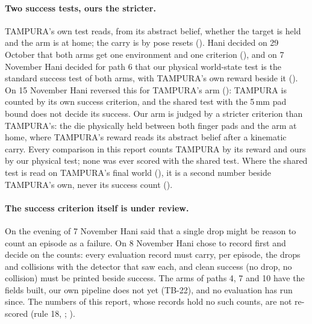 \paragraph{Two success tests, ours the stricter.} TAMPURA's own test reads, from its abstract belief,
whether the target is held and the arm is at home; the carry is by pose resets
(). Hani decided on 29
October that both arms get one environment and one criterion (), and on 7
November Hani decided for path 6 that our physical world-state test is the standard
success test of both arms, with TAMPURA's own reward beside it (). On 15 November
Hani reversed this for TAMPURA's arm (): TAMPURA is
counted by its own success criterion, and the shared test with the 5\,mm pad bound
does not decide its success. Our arm is judged by a stricter criterion than
TAMPURA's: the die physically held between both finger pads and the arm at home,
where TAMPURA's reward reads its abstract belief after a kinematic carry. Every
comparison in this report counts TAMPURA by its reward and ours by our physical test;
none was ever scored with the shared test. Where the shared test is read on TAMPURA's
final world (), it is a second number beside TAMPURA's own, never its success
count ().

\paragraph{The success criterion itself is under review.} On the evening of 7 November
Hani said that a single drop might be reason to count an episode as a failure. On 8
November Hani chose to record first and decide on the counts: every evaluation record
must carry, per episode, the drops and collisions with the detector that saw each, and
clean success (no drop, no collision) must be printed beside success. The arms of paths 4, 7 and 10 have the fields built, our own pipeline does not yet (TB-22), and no evaluation has run since. The numbers of this
report, whose records hold no such counts, are not re-scored (rule 18,
; ).

